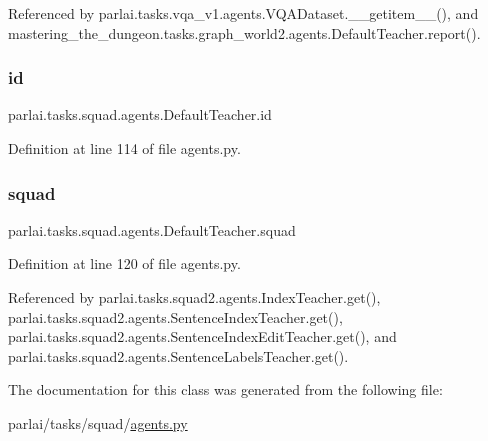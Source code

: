 Referenced by parlai.\+tasks.\+vqa\+\_\+v1.\+agents.\+V\+Q\+A\+Dataset.\+\_\+\+\_\+getitem\+\_\+\+\_\+(), and mastering\+\_\+the\+\_\+dungeon.\+tasks.\+graph\+\_\+world2.\+agents.\+Default\+Teacher.\+report().

\mbox{\label{classparlai_1_1tasks_1_1squad_1_1agents_1_1DefaultTeacher_ae51a07a1f37ddb5fe3678c96f63dc0bb}} 
\subsubsection{\texorpdfstring{id}{id}}
{\footnotesize\ttfamily parlai.\+tasks.\+squad.\+agents.\+Default\+Teacher.\+id}



Definition at line 114 of file agents.\+py.

\mbox{\label{classparlai_1_1tasks_1_1squad_1_1agents_1_1DefaultTeacher_abb3ff77f4a8e5db1ba233fe0fa80b02a}} 
\subsubsection{\texorpdfstring{squad}{squad}}
{\footnotesize\ttfamily parlai.\+tasks.\+squad.\+agents.\+Default\+Teacher.\+squad}



Definition at line 120 of file agents.\+py.



Referenced by parlai.\+tasks.\+squad2.\+agents.\+Index\+Teacher.\+get(), parlai.\+tasks.\+squad2.\+agents.\+Sentence\+Index\+Teacher.\+get(), parlai.\+tasks.\+squad2.\+agents.\+Sentence\+Index\+Edit\+Teacher.\+get(), and parlai.\+tasks.\+squad2.\+agents.\+Sentence\+Labels\+Teacher.\+get().



The documentation for this class was generated from the following file\+:\begin{DoxyCompactItemize}
\item 
parlai/tasks/squad/\hyperlink{parlai_2tasks_2squad_2agents_8py}{agents.\+py}\end{DoxyCompactItemize}
